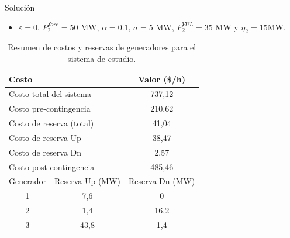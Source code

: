 \begin{frame}{Solución}
\begin{itemize}
    \item $\varepsilon = 0$, $P^{fore}_{2} = 50$ MW, $\alpha = 0.1$, $\sigma = 5$ MW, $P^{VUL}_{2} = 35$ MW y $\eta_{2} = 15$MW.
\end{itemize}

\small
\begin{table}[H]
	\renewcommand{\arraystretch}{1.3}
	\centering
	\caption{Resumen de costos y reservas de generadores para el sistema de estudio.}
	\label{tab:res_ctos}
	\begin{tabular}{|c|c|c|}
		\hline
		\multicolumn{2}{|l|}{Costo} & Valor (\$/h) \\
		\hline
		\multicolumn{2}{|l|}{Costo total del sistema} & 737,12 \\
		\multicolumn{2}{|l|}{Costo pre-contingencia} & 210,62 \\
		\multicolumn{2}{|l|}{Costo de reserva (total)} & 41,04 \\
		\multicolumn{2}{|l|}{Costo de reserva Up} & 38,47 \\
		\multicolumn{2}{|l|}{Costo de reserva Dn} & 2,57 \\
		\multicolumn{2}{|l|}{Costo post-contingencia} & 485,46 \\
		\hline \hline
		Generador & Reserva Up (MW) & Reserva Dn (MW) \\
		\hline
		1 & 7,6 & 0 \\
		2 & 1,4 & 16,2 \\
		3 & 43,8 & 1,4 \\
		\hline
	\end{tabular}
\end{table}
\end{frame}

